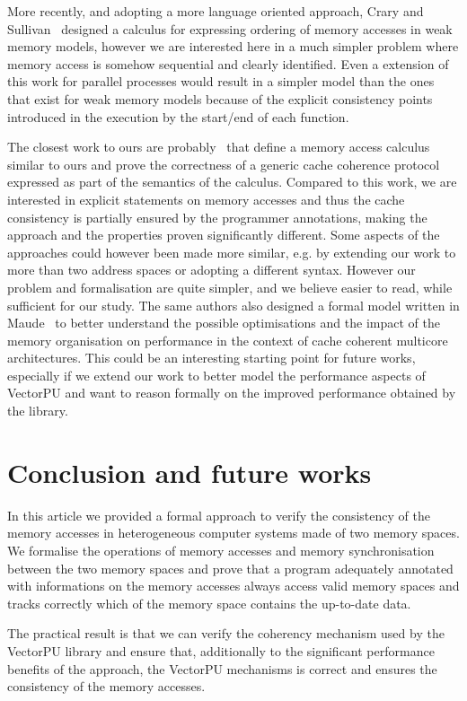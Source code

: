 \documentclass[preprint,12pt]{elsarticle}
\begin{document}
More recently, and adopting a more language oriented approach, Crary and 
Sullivan~\cite{Crary:POPL:2015} designed 
a calculus for expressing ordering of memory accesses in weak memory models, however we 
are interested here in a much simpler problem where memory access is somehow sequential 
and clearly identified. 
Even a  extension of this work for parallel processes would  result in a 
simpler model than the ones that exist for weak memory models because of the explicit 
consistency points introduced in the execution by the start/end of each function. 

The closest work to ours are probably~\cite{BJPTSAC16} that define a memory access calculus similar to ours and prove the 
correctness of a generic cache coherence protocol expressed as part of the semantics of 
the calculus. Compared to this work, we are interested in explicit statements on memory 
accesses and thus the cache consistency is partially ensured  by the programmer 
annotations, making the approach and the properties proven significantly different. Some 
aspects of the approaches could however been made more similar, e.g. by extending our 
work to more than two address spaces or adopting a different  syntax. However our problem 
and formalisation are quite simpler, and we 
believe easier to read, while sufficient for our study.
The same authors also designed a formal model written in Maude~\cite{BJPTMaude16} to 
better understand the possible 
optimisations and the impact of the memory organisation on performance in the context of 
cache coherent multicore architectures. This could be an interesting starting point for 
future works, especially if we 
extend our work to better model the performance aspects of VectorPU and want to reason 
formally on the improved performance obtained by the library.

\section{Conclusion and future works}\label{sec:conclusion}
In this article we provided a formal approach to verify the consistency of the memory 
accesses in heterogeneous computer systems made of two memory spaces. We formalise the 
operations of memory accesses and memory synchronisation between the two memory spaces 
and prove that a program adequately annotated with informations on the memory accesses 
always access valid memory spaces and tracks correctly which of the memory space contains 
the up-to-date data.

The practical result is that we can verify the coherency mechanism used by the VectorPU 
library and ensure that, additionally to the significant performance benefits of the 
approach, the VectorPU mechanisms is correct and ensures the consistency of the memory 
accesses.
\end{document}
